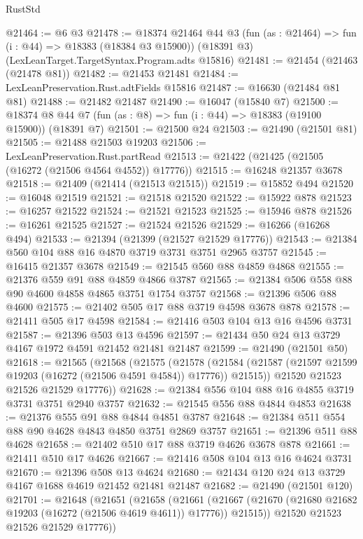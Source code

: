 \begin{lexlean}{RustStd}
\begin{coremodule}
@21464 := @6 @3
@21478 := @18374
    @21464
    @44
    @3
    (fun (as : @21464) => fun (i : @44) => @18383 (@18384 @3 @15900))
    (@18391 @3)
    (LexLeanTarget.TargetSyntax.Program.adts @15816)
@21481 := @21454 (@21463 (@21478 @81))
@21482 := @21453 @21481
@21484 := LexLeanPreservation.Rust.adtFields @15816
@21487 := @16630 (@21484 @81 @81)
@21488 := @21482 @21487
@21490 := @16047 (@15840 @7)
@21500 := @18374 @8 @44 @7 (fun (as : @8) => fun (i : @44) => @18383 (@19100 @15900)) (@18391 @7)
@21501 := @21500 @24
@21503 := @21490 (@21501 @81)
@21505 := @21488 @21503 @19203
@21506 := LexLeanPreservation.Rust.partRead
@21513 := @21422 (@21425 (@21505 (@16272 (@21506 @4564 @4552)) @17776))
@21515 := @16248 @21357 @3678
@21518 := @21409 (@21414 (@21513 @21515))
@21519 := @15852 @494
@21520 := @16048 @21519
@21521 := @21518 @21520
@21522 := @15922 @878
@21523 := @16257 @21522
@21524 := @21521 @21523
@21525 := @15946 @878
@21526 := @16261 @21525
@21527 := @21524 @21526
@21529 := @16266 (@16268 @494)
@21533 := @21394 (@21399 (@21527 @21529 @17776))
@21543 := @21384 @560 @104 @88 @16 @4870 @3719 @3731 @3751 @2965 @3757
@21545 := @16415 @21357 @3678
@21549 := @21545 @560 @88 @4859 @4868
@21555 := @21376 @559 @91 @88 @4859 @4866 @3787
@21565 := @21384 @506 @558 @88 @90 @4600 @4858 @4865 @3751 @1754 @3757
@21568 := @21396 @506 @88 @4600
@21575 := @21402 @505 @17 @88 @3719 @4598 @3678 @878
@21578 := @21411 @505 @17 @4598
@21584 := @21416 @503 @104 @13 @16 @4596 @3731
@21587 := @21396 @503 @13 @4596
@21597 := @21434 @50 @24 @13 @3729 @4167 @1972 @4591 @21452 @21481 @21487
@21599 := @21490 (@21501 @50)
@21618 := @21565
    (@21568
      (@21575
        (@21578
          (@21584 (@21587 (@21597 @21599 @19203 (@16272 (@21506 @4591 @4584)) @17776)) @21515))
        @21520
        @21523
        @21526
        @21529
        @17776))
@21628 := @21384 @556 @104 @88 @16 @4855 @3719 @3731 @3751 @2940 @3757
@21632 := @21545 @556 @88 @4844 @4853
@21638 := @21376 @555 @91 @88 @4844 @4851 @3787
@21648 := @21384 @511 @554 @88 @90 @4628 @4843 @4850 @3751 @2869 @3757
@21651 := @21396 @511 @88 @4628
@21658 := @21402 @510 @17 @88 @3719 @4626 @3678 @878
@21661 := @21411 @510 @17 @4626
@21667 := @21416 @508 @104 @13 @16 @4624 @3731
@21670 := @21396 @508 @13 @4624
@21680 := @21434 @120 @24 @13 @3729 @4167 @1688 @4619 @21452 @21481 @21487
@21682 := @21490 (@21501 @120)
@21701 := @21648
    (@21651
      (@21658
        (@21661
          (@21667 (@21670 (@21680 @21682 @19203 (@16272 (@21506 @4619 @4611)) @17776)) @21515))
        @21520
        @21523
        @21526
        @21529
        @17776))

\end{coremodule}
\end{lexlean}
